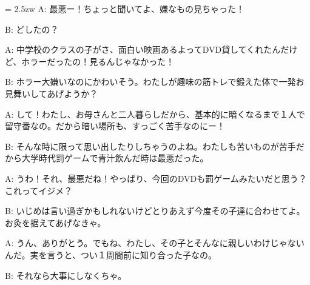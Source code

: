 \documentclass[11pt]{amsart}
\title{}
\author{}
\newenvironment{hangall}[1]{\hangindent = 2.5zw\everypar{\hangindent = 2.5zw}}{}
\begin{document}
\maketitle
\begin{hangall}{}%
A: 最悪ー！ちょっと聞いてよ、嫌なもの見ちゃった！



B: どしたの？



A: 中学校のクラスの子がさ、面白い映画あるよってDVD貸してくれたんだけど、ホラーだったの！見るんじゃなかった！



B: ホラー大嫌いなのにかわいそう。わたしが趣味の筋トレで鍛えた体で一発お見舞いしてあげようか？



A: して！わたし、お母さんと二人暮らしだから、基本的に暗くなるまで１人で留守番なの。だから暗い場所も、すっごく苦手なのにー！



B: そんな時に限って思い出したりしちゃうのよね。わたしも苦いものが苦手だから大学時代罰ゲームで青汁飲んだ時は最悪だった。



A: うわ！それ、最悪だね！やっぱり、今回のDVDも罰ゲームみたいだと思う？これってイジメ？



B: いじめは言い過ぎかもしれないけどとりあえず今度その子達に合わせてよ。お灸を据えてあげなきゃ。



A: うん、ありがとう。でもね、わたし、その子とそんなに親しいわけじゃないんだ。実を言うと、つい１周間前に知り合った子なの。



B: それなら大事にしなくちゃ。\end{hangall}
\end{document}
